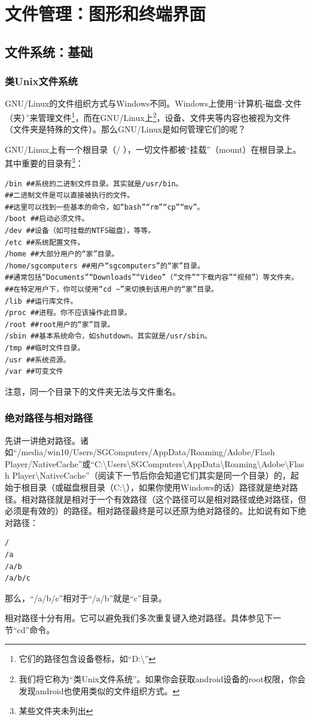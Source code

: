 \documentclass{book}
\begin{document}
\section{文件管理：图形和终端界面}
\subsection{文件系统：基础}
\subsubsection{类Unix文件系统}
GNU/Linux的文件组织方式与Windows不同。Windows上使用“计算机-磁盘-文件（夹）”来管理文件\footnote{它们的路径包含设备卷标，如“D:\textbackslash”}，而在GNU/Linux上\footnote{我们将它称为“类Unix文件系统”。如果你会获取android设备的root权限，你会发现android也使用类似的文件组织方式。}，设备、文件夹等内容也被视为文件（文件夹是特殊的文件）。那么GNU/Linux是如何管理它们的呢？\par
GNU/Linux上有一个根目录（/ ），一切文件都被“挂载”（mount）在根目录上。其中重要的目录有\footnote{某些文件夹未列出}：
\begin{verbatim}
/bin ##系统的二进制文件目录。其实就是/usr/bin。
##二进制文件是可以直接被执行的文件。
##这里可以找到一些基本的命令，如“bash”“rm”“cp”“mv”。
/boot ##启动必须文件。
/dev ##设备（如可挂载的NTFS磁盘），等等。
/etc ##系统配置文件。
/home ##大部分用户的“家”目录。
/home/sgcomputers ##用户“sgcomputers”的“家”目录。
##通常包括“Documents”“Downloads”“Video”（“文件”“下载内容”“视频”）等文件夹。
##在特定用户下，你可以使用“cd ~”来切换到该用户的“家”目录。
/lib ##运行库文件。
/proc ##进程。你不应该操作此目录。
/root ##root用户的“家”目录。
/sbin ##基本系统命令，如shutdown。其实就是/usr/sbin。
/tmp ##临时文件目录。
/usr ##系统资源。
/var ##可变文件
\end{verbatim}
注意，同一个目录下的文件夹无法与文件重名。
\subsubsection{绝对路径与相对路径}
先讲一讲绝对路径。诸如“/media/win10/Users/SGComputers/AppData/Roaming/Adobe/Flash Player/NativeCache”或“C:\textbackslash Users\textbackslash SGComputers\textbackslash AppData\textbackslash Roaming\textbackslash Adobe\textbackslash Flash Player\textbackslash NativeCache”（阅读下一节后你会知道它们其实是同一个目录）的，起始于根目录（或磁盘根目录（C:\textbackslash），如果你使用Windows的话）路径就是绝对路径。相对路径就是相对于一个有效路径（这个路径可以是相对路径或绝对路径，但必须是有效的）的路径。相对路径最终是可以还原为绝对路径的。比如说有如下绝对路径：
\begin{verbatim}
/
/a
/a/b
/a/b/c
\end{verbatim}
那么，“/a/b/c”相对于“/a/b”就是“c”目录。\par
相对路径十分有用。它可以避免我们多次重复键入绝对路径。具体参见下一节“cd”命令。
\end{document}
